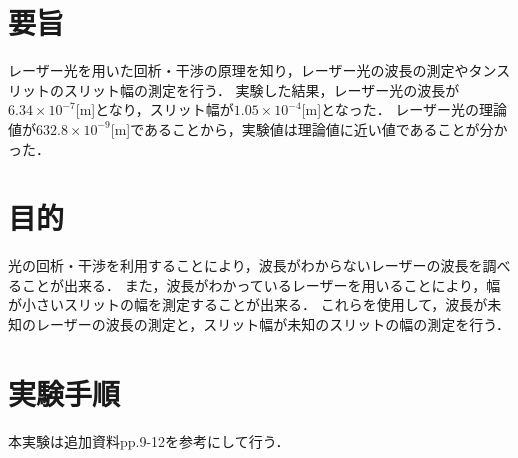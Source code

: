 \documentclass[a4paper,11pt]{ltjsarticle}
\begin{document}
\section{要旨}
レーザー光を用いた回析・干渉の原理を知り，レーザー光の波長の測定やタンスリットのスリット幅の測定を行う．
実験した結果，レーザー光の波長が$6.34 \times 10^{-7}$[m]となり，スリット幅が$1.05 \times 10^{-4}$[m]となった．
レーザー光の理論値が$632.8 \times 10^{-9}$[m]であることから，実験値は理論値に近い値であることが分かった．
\section{目的}
光の回析・干渉を利用することにより，波長がわからないレーザーの波長を調べることが出来る．
また，波長がわかっているレーザーを用いることにより，幅が小さいスリットの幅を測定することが出来る．
これらを使用して，波長が未知のレーザーの波長の測定と，スリット幅が未知のスリットの幅の測定を行う．
\section{実験手順}
本実験は追加資料pp.9-12を参考にして行う．
\end{document}
